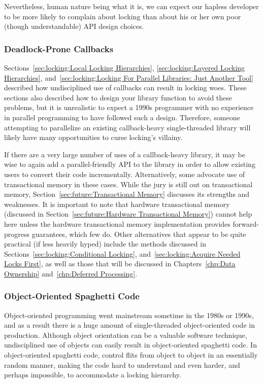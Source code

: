 Nevertheless, human nature being what it is, we can expect our hapless
developer to be more likely to complain about locking than about his
or her own poor (though understandable) API design choices.

\subsubsection{Deadlock-Prone Callbacks}
\label{sec:locking:Deadlock-Prone Callbacks}

Sections~\ref{sec:locking:Local Locking Hierarchies},
\ref{sec:locking:Layered Locking Hierarchies},
and~\ref{sec:locking:Locking For Parallel Libraries: Just Another Tool}
described how undisciplined use of callbacks can result in locking
woes.
These sections also described how to design your library function to
avoid these problems, but it is unrealistic to expect a 1990s programmer
with no experience in parallel programming to have followed such a design.
Therefore, someone attempting to parallelize an existing callback-heavy
single-threaded library will likely have many opportunities to curse
locking's villainy.

If there are a very large number of uses of a callback-heavy library,
it may be wise to again add a parallel-friendly API to the library in
order to allow existing users to convert their code incrementally.
Alternatively, some advocate use of transactional memory in these cases.
While the jury is still out on transactional memory,
Section~\ref{sec:future:Transactional Memory} discusses its strengths and
weaknesses.
It is important to note that hardware transactional memory
(discussed in
Section~\ref{sec:future:Hardware Transactional Memory})
cannot help here unless the hardware transactional memory implementation
provides forward-progress guarantees, which few do.
Other alternatives that appear to be quite practical (if less heavily
hyped) include the methods discussed in
Sections~\ref{sec:locking:Conditional Locking},
and~\ref{sec:locking:Acquire Needed Locks First},
as well as those that will be discussed in
Chapters~\ref{chp:Data Ownership}
and~\ref{chp:Deferred Processing}.

\subsubsection{Object-Oriented Spaghetti Code}
\label{sec:locking:Object-Oriented Spaghetti Code}

Object-oriented programming went mainstream sometime in the 1980s or
1990s, and as a result there is a huge amount of single-threaded
object-oriented code in production.
Although object orientation can be a valuable software technique,
undisciplined use of objects can easily result in object-oriented
spaghetti code.
In object-oriented spaghetti code, control flits from object to object
in an essentially random manner, making the code hard to understand
and even harder, and perhaps impossible, to accommodate a locking hierarchy.

